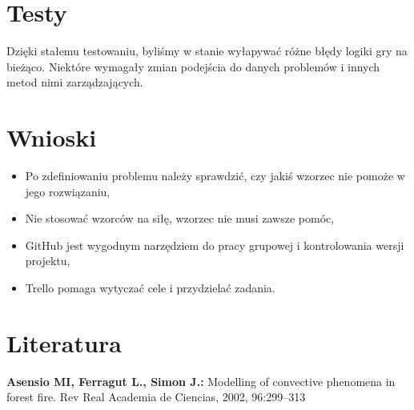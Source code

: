 \documentclass[a4paper, 11pt]{article}
\begin{document}
	\section{Testy}
	Dzięki stałemu testowaniu, byliśmy w stanie wyłapywać różne błędy logiki gry na bieżąco. Niektóre wymagały zmian podejścia do danych problemów i innych metod nimi zarządzających. 

	\section{Wnioski}
	\begin{itemize}
	\item Po zdefiniowaniu problemu należy sprawdzić, czy jakiś wzorzec nie pomoże w jego rozwiązaniu,
	\item Nie stosować wzorców na siłę, wzorzec nie musi zawsze pomóc,
	\item GitHub jest wygodnym narzędziem do pracy grupowej i kontrolowania wersji projektu,
	\item Trello pomaga wytyczać cele i przydzielać zadania.
	\end{itemize}
	

	\section{Literatura}
	
\textbf{Asensio MI, Ferragut L., Simon J.:} Modelling of convective phenomena in forest fire. Rev Real Academia de Ciencias, 2002, 96:299–313\\
\end{document}
